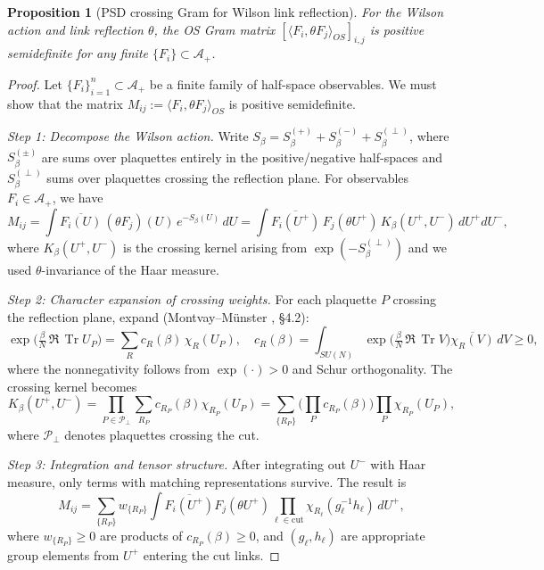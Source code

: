 \documentclass[11pt]{amsart}
\theoremstyle{plain}
\newtheorem{proposition}[theorem]{Proposition}
\theoremstyle{definition}
\theoremstyle{remark}
\begin{document}
\begin{proposition}[PSD crossing Gram for Wilson link reflection]\label{prop:psd-crossing-gram}
For the Wilson action and link reflection $\theta$, the OS Gram matrix $[\langle F_i,\theta F_j\rangle_{OS}]_{i,j}$ is positive semidefinite for any finite $\{F_i\}\subset\mathcal A_+$.
\end{proposition}
\begin{proof}
Let $\{F_i\}_{i=1}^n \subset \mathcal A_+$ be a finite family of half-space observables. We must show that the matrix $M_{ij} := \langle F_i, \theta F_j \rangle_{OS}$ is positive semidefinite.

\emph{Step 1: Decompose the Wilson action.} Write $S_\beta = S_\beta^{(+)} + S_\beta^{(-)} + S_\beta^{(\perp)}$, where $S_\beta^{(\pm)}$ are sums over plaquettes entirely in the positive/negative half-spaces and $S_\beta^{(\perp)}$ sums over plaquettes crossing the reflection plane. For observables $F_i \in \mathcal A_+$, we have
\[
  M_{ij} = \int \overline{F_i(U)} \, (\theta F_j)(U) \, e^{-S_\beta(U)} \, dU = \int \overline{F_i(U^+)} \, F_j(\theta U^+) \, K_\beta(U^+, U^-) \, dU^+ dU^-,
\]
where $K_\beta(U^+, U^-)$ is the crossing kernel arising from $\exp(-S_\beta^{(\perp)})$ and we used $\theta$-invariance of the Haar measure.

\emph{Step 2: Character expansion of crossing weights.} For each plaquette $P$ crossing the reflection plane, expand (Montvay--M\"unster \cite{MontvayMunster1994}, §4.2):
\[
  \exp\Big(\tfrac{\beta}{N}\,\Re\,\operatorname{Tr} U_P\Big) = \sum_{R} c_R(\beta)\,\chi_R(U_P), \quad c_R(\beta) = \int_{SU(N)} \exp\Big(\tfrac{\beta}{N}\,\Re\,\operatorname{Tr} V\Big) \overline{\chi_R(V)} \, dV \ge 0,
\]
where the nonnegativity follows from $\exp(\cdot) > 0$ and Schur orthogonality. The crossing kernel becomes
\[
  K_\beta(U^+, U^-) = \prod_{P \in \mathcal P_\perp} \sum_{R_P} c_{R_P}(\beta) \chi_{R_P}(U_P) = \sum_{\{R_P\}} \Big(\prod_{P} c_{R_P}(\beta)\Big) \prod_{P} \chi_{R_P}(U_P),
\]
where $\mathcal P_\perp$ denotes plaquettes crossing the cut.

\emph{Step 3: Integration and tensor structure.} After integrating out $U^-$ with Haar measure, only terms with matching representations survive. The result is
\[
  M_{ij} = \sum_{\{R_P\}} w_{\{R_P\}} \int \overline{F_i(U^+)} F_j(\theta U^+) \prod_{\ell \in \text{cut}} \chi_{R_\ell}(g_\ell^{-1} h_\ell) \, dU^+,
\]
where $w_{\{R_P\}} \ge 0$ are products of $c_{R_P}(\beta) \ge 0$, and $(g_\ell, h_\ell)$ are appropriate group elements from $U^+$ entering the cut links.


\end{proof}
\end{document}
